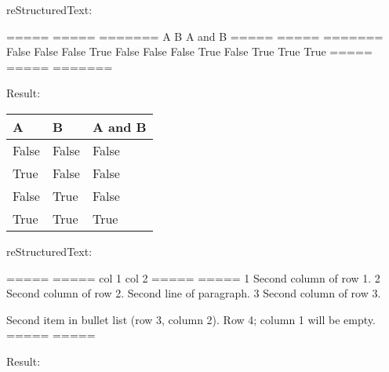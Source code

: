 \documentclass[letterpaper,12pt,english]{sphinxmanual}
\begin{document}
reStructuredText:

\begin{sphinxVerbatim}[commandchars=\\\{\}]
=====  =====  =======
  A      B    A and B
=====  =====  =======
False  False  False
True   False  False
False  True   False
True   True   True
=====  =====  =======
\end{sphinxVerbatim}

Result:


\begin{savenotes}\sphinxattablestart
\centering
\begin{tabulary}{\linewidth}[t]{|T|T|T|}
\hline
\sphinxstyletheadfamily 
A
&\sphinxstyletheadfamily 
B
&\sphinxstyletheadfamily 
A and B
\\
\hline
False
&
False
&
False
\\
\hline
True
&
False
&
False
\\
\hline
False
&
True
&
False
\\
\hline
True
&
True
&
True
\\
\hline
\end{tabulary}
\par
\sphinxattableend\end{savenotes}

reStructuredText:

\begin{sphinxVerbatim}[commandchars=\\\{\}]
=====  =====
col 1  col 2
=====  =====
1      Second column of row 1.
2      Second column of row 2.
       Second line of paragraph.
3      \PYGZhy{} Second column of row 3.

        Second item in bullet
         list (row 3, column 2).
\PYGZbs{}      Row 4; column 1 will be empty.
=====  =====
\end{sphinxVerbatim}

Result:
\end{document}
